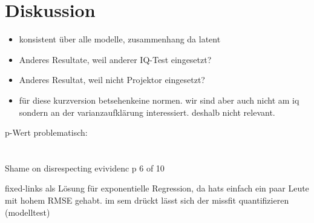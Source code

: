 \documentclass[11pt, twoside, a4paper]{book}		%
\begin{document}
\chapter{Diskussion \label{cha:Diskussion}}
\begin{itemize}
	\item konsistent über alle modelle, zusammenhang da latent
	\item Anderes Resultate, weil anderer IQ-Test eingesetzt?
	\item Anderes Resultat, weil nicht Projektor eingesetzt?
	\item für diese kurzversion betsehenkeine normen. wir sind aber auch nicht am iq sondern an der varianzaufklärung interessiert. deshalb nicht relevant.
\end{itemize}

p-Wert problematisch:\\
\citet{Gelman2006}\\
\citet{Wasserstein2016}\\
\citet{Nuzzo2014}
\citet{Hayduk2014} Shame on disrespecting evividenc p 6 of 10


fixed-links als Lösung für exponentielle Regression, da hats einfach ein paar Leute mit hohem RMSE gehabt. im sem drückt lässt sich der missfit quantifizieren (modelltest)





\printglossaries	%


\renewcommand\bibname{Literatur}				%

\appendix
\setcounter{figure}{0}
\renewcommand\thefigure{\Alph{appndx}\@arabic\c@figure}
\setcounter{table}{0}
\renewcommand{\thetable}{A\arabic{table}}
\end{document}
